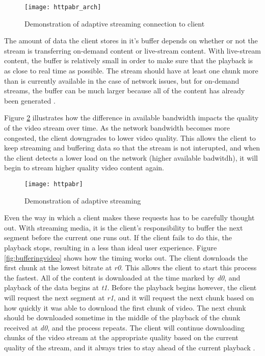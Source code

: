 \documentclass[12pt]{article}
\begin{document}
\begin{figure}[htb]
  \begin{center}
    \texttt{[image: httpabr\_arch]}
    \caption{Demonstration of adaptive streaming connection to client}
    \label{fig:httpabr_arch}
  \end{center}
\end{figure}

The amount of data the client stores in it's buffer depends on whether or not the stream is transferring on-demand content or live-stream content.  With live-stream content, the buffer is relatively small in order to make sure that the playback is as close to real time as possible.  The stream should have at least one chunk more than is currently available in the case of network issues, but for on-demand streams, the buffer can be much larger because all of the content has already been generated \cite{5986186}.


Figure \ref{fig:httpabr} illustrates how the difference in available bandwidth impacts the quality of the video stream over time.  As the network bandwidth becomes more congested, the client downgrades to lower video quality.  This allows the client to keep streaming and buffering data so that the stream is not interupted, and when the client detects a lower load on the network (higher available badwitdh), it will begin to stream higher quality video content again.

\begin{figure}[htb]
  \begin{center}
    \texttt{[image: httpabr]}
    \caption{Demonstration of adaptive streaming}
    \label{fig:httpabr}
  \end{center}
\end{figure}


Even the way in which a client makes these requests has to be carefully thought out.  With streaming media, it is the client's responsibility to buffer the next segment before the current one runs out.  If the client fails to do this, the playback stops, resulting in a less than ideal user experience.  Figure \ref{fig:bufferingvideo} shows how the timing works out.  The client downloads the first chunk at the lowest bitrate at \textit{r0}.  This allows the client to start this process the fastest.  All of the content is downloaded at the time marked by \textit{d0}, and playback of the data begins at \textit{t1}.  Before the playback begins however, the client will request the next segment at \textit{r1}, and it will request the next chunk based on how quickly it was able to download the first chunk of video.  The next chunk should be downloaded sometime in the middle of the playback of the chunk received at \textit{d0}, and the process repeats.  The client will continue downloading chunks of the video stream at the appropriate quality based on the current quality of the stream, and it always tries to stay ahead of the current playback \cite{Tanwir201674}.
\end{document}
